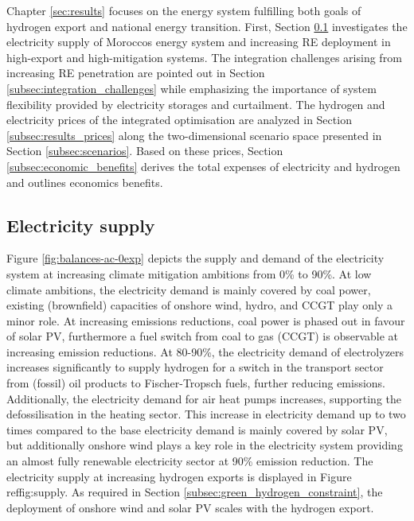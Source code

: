 Chapter \ref{sec:results} focuses on the energy system fulfilling both goals of hydrogen export and national energy transition. First, Section \ref{subsec:supply} investigates the electricity supply of Moroccos energy system and increasing RE deployment in high-export and high-mitigation systems.
The integration challenges arising from increasing RE penetration are pointed out in Section \ref{subsec:integration_challenges} while emphasizing the importance of system flexibility provided by electricity storages and curtailment. The hydrogen and electricity prices of the integrated optimisation are analyzed in Section \ref{subsec:results_prices} along the two-dimensional scenario space presented in Section \ref{subsec:scenarios}. Based on these prices, Section \ref{subsec:economic_benefits} derives the total expenses of electricity and hydrogen and outlines economics benefits. 

\label{subsec:supply}
\label{subsec:integration_challenges}
\label{subsec:results_prices}
\label{subsec:economic_benefits}
\label{subsec:sensitivity}

\subsection{Electricity supply}
\label{subsec:supply}
Figure \ref{fig:balances-ac-0exp} depicts the supply and demand of the electricity system at increasing climate mitigation ambitions from 0\% to 90\%. At low climate ambitions, the electricity demand is mainly covered by coal power, existing (brownfield) capacities of onshore wind, hydro, and CCGT play only a minor role. At increasing emissions reductions, coal power is phased out in favour of solar PV, furthermore a fuel switch from coal to gas (CCGT) is observable at increasing emission reductions. At 80-90\%, the electricity demand of electrolyzers increases significantly to supply hydrogen for a switch in the transport sector from (fossil) oil products to Fischer-Tropsch fuels, further reducing emissions. Additionally, the electricity demand for air heat pumps increases, supporting the defossilisation in the heating sector. This increase in electricity demand up to two times compared to the base electricity demand is mainly covered by solar PV, but additionally onshore wind plays a key role in the electricity system providing an almost fully renewable electricity sector at 90\% emission reduction.
The electricity supply at increasing hydrogen exports is displayed in Figure ref{fig:supply}. As required in Section \ref{subsec:green_hydrogen_constraint}, the deployment of onshore wind and solar PV scales with the hydrogen export.

